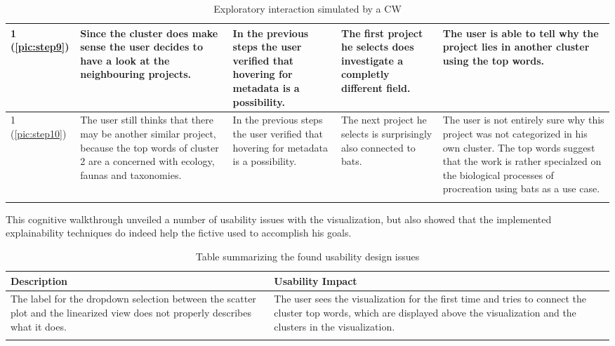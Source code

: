 {\begin{longtable}[l]{| p{} | p{} | p{} | p{} | p{} |}
	1 (\autoref{pic:step9}) &
	Since the cluster does make sense the user decides to have a look at the neighbouring projects. &
	In the previous steps the user verified that hovering for metadata is a possibility. &
	The first project he selects does investigate a completly different field. &
	The user is able to tell why the project lies in another cluster using the top words. \\ \hline
	1 (\autoref{pic:step10}) &
	The user still thinks that there may be another similar project, because the top words of cluster 2 are a concerned with ecology, faunas and taxonomies. &
	In the previous steps the user verified that hovering for metadata is a possibility. &
	The next project he selects is surprisingly also connected to bats.  &
	The user is not entirely sure why this project was not categorized in his own cluster. The top words suggest that the work is rather specialzed on the biological processes of procreation using bats as a use case.  \\ \hline
	
	
	
	
	
	\caption{Exploratory interaction simulated by a CW} 
	\label{tab:steps_cw}
\end{longtable}}

This cognitive walkthrough unveiled a number of usability issues with the visualization, but also showed that the implemented explainability techniques do indeed help the fictive used to accomplish his goals. 

\newpage

\begin{longtable}[l]{| p{} | p{}  |} 
	\hline
	Description & Usability Impact \\ \hline \hline
	The label for the dropdown selection between the scatter plot and the linearized view does not properly describes what it does. & 
	The user sees the visualization for the first time and tries to connect the cluster top words, which are displayed above the visualization and the clusters in the visualization. \\ \hline
	
	\caption{Table summarizing the found usability design issues} 
	\label{tab:usability_problems}
\end{longtable}
